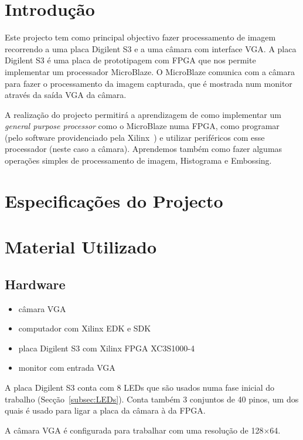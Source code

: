 \documentclass[a4paper]{article}
\begin{document}


\tableofcontents
\pagebreak

\section{Introdução}
Este projecto tem como principal objectivo fazer processamento de imagem recorrendo a uma placa Digilent S3 e a uma câmara com interface VGA. A placa Digilent S3 é uma placa de prototipagem com FPGA que nos permite implementar um processador MicroBlaze. O MicroBlaze comunica com a câmara para fazer o processamento da imagem capturada, que é mostrada num monitor através da saída VGA da câmara.

A realização do projecto permitirá a aprendizagem de como implementar um \textit{general purpose processor} como o MicroBlaze numa FPGA, como programar (pelo software providenciado pela Xilinx\textregistered\ ) e utilizar periféricos com esse processador (neste caso a câmara). Aprendemos também como fazer algumas operações simples de processamento de imagem, Histograma e Embossing.


\section{Especificações do Projecto}

\section{Material Utilizado}
\subsection*{Hardware}
\begin{itemize}
\item câmara VGA
\item computador com Xilinx EDK e SDK
\item placa Digilent S3 com Xilinx FPGA XC3S1000-4
\item monitor com entrada VGA
\end{itemize}

A placa Digilent S3 conta com 8 LEDs que são usados numa fase inicial do trabalho (Secção~\ref{subsec:LEDs}). Conta também 3 conjuntos de 40 pinos, um dos quais é usado para ligar a placa da câmara à da FPGA.

A câmara VGA é configurada para trabalhar com uma resolução de 128$\times$64.
\end{document}
